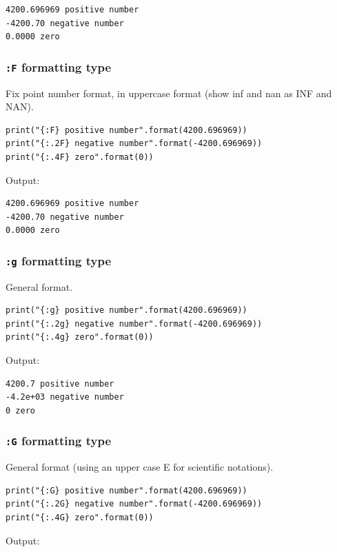 \documentclass[11pt]{article}
\begin{document}
\begin{verbatim}
4200.696969 positive number
-4200.70 negative number
0.0000 zero
\end{verbatim}

\subsubsection{\texttt{:F} formatting type}
\label{sec:org45e353a}
Fix point number format, in uppercase format (show inf and nan as INF and NAN).

\begin{verbatim}
print("{:F} positive number".format(4200.696969))
print("{:.2F} negative number".format(-4200.696969))
print("{:.4F} zero".format(0))
\end{verbatim}

 \noindent Output:

\begin{verbatim}
4200.696969 positive number
-4200.70 negative number
0.0000 zero
\end{verbatim}

\subsubsection{\texttt{:g} formatting type}
\label{sec:orgbe044e4}
General format.

\begin{verbatim}
print("{:g} positive number".format(4200.696969))
print("{:.2g} negative number".format(-4200.696969))
print("{:.4g} zero".format(0))
\end{verbatim}

 \noindent Output:

\begin{verbatim}
4200.7 positive number
-4.2e+03 negative number
0 zero
\end{verbatim}

\subsubsection{\texttt{:G} formatting type}
\label{sec:org8f1f0c4}
General format (using an upper case E for scientific notations).

\begin{verbatim}
print("{:G} positive number".format(4200.696969))
print("{:.2G} negative number".format(-4200.696969))
print("{:.4G} zero".format(0))
\end{verbatim}

 \noindent Output:
\end{document}
